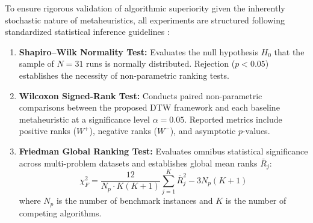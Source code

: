 To ensure rigorous validation of algorithmic superiority given the inherently stochastic nature of metaheuristics, all experiments are structured following standardized statistical inference guidelines \cite{derrac2011practical,carrasco2020recent}:
\begin{enumerate}
    \item \textbf{Shapiro--Wilk Normality Test:} Evaluates the null hypothesis $H_0$ that the sample of $N=31$ runs is normally distributed. Rejection ($p < 0.05$) establishes the necessity of non-parametric ranking tests.
    \item \textbf{Wilcoxon Signed-Rank Test:} Conducts paired non-parametric comparisons between the proposed DTW framework and each baseline metaheuristic at a significance level $\alpha = 0.05$. Reported metrics include positive ranks ($W^+$), negative ranks ($W^-$), and asymptotic $p$-values.
    \item \textbf{Friedman Global Ranking Test:} Evaluates omnibus statistical significance across multi-problem datasets and establishes global mean ranks $\bar{R}_j$:
    \begin{equation}
    \chi_F^2 = \frac{12}{N_p \cdot K(K+1)} \sum_{j=1}^{K} \bar{R}_j^2 - 3 N_p(K+1)
    \label{eq:friedman_stat}
    \end{equation}
    where $N_p$ is the number of benchmark instances and $K$ is the number of competing algorithms.
\end{enumerate}
